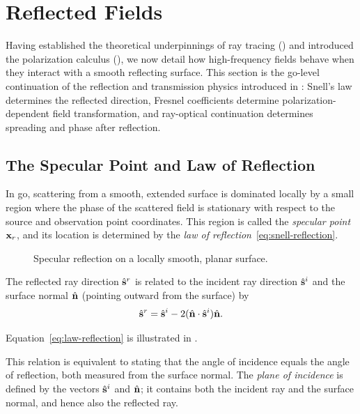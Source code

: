\section{\texorpdfstring{}{Geometrical Optics} Reflected Fields}

Having established the theoretical underpinnings of ray tracing () and introduced the polarization calculus (), we now detail how high-frequency fields behave when they interact with a smooth reflecting surface. This section is the \gls{go}-level continuation of the reflection and transmission physics introduced in : Snell's law determines the reflected direction, Fresnel coefficients determine polarization-dependent field transformation, and ray-optical continuation determines spreading and phase after reflection.

\subsection{The Specular Point and Law of Reflection}

In \gls{go}, scattering from a smooth, extended surface is dominated locally by a small region where the phase of the scattered field is stationary with respect to the source and observation point coordinates. This region is called the \emph{specular point} $\mathbf{x}_r$, and its location is determined by the \emph{law of reflection}~\eqref{eq:snell-reflection}.

\begin{figure}
  \centering
  \caption{Specular reflection on a locally smooth, planar surface.}
\end{figure}

The reflected ray direction $\hat{\mathbf{s}}^r$ is related to the incident ray direction $\hat{\mathbf{s}}^i$ and the surface normal $\hat{\mathbf{n}}$ (pointing outward from the surface) by
\begin{equation}
  \hat{\mathbf{s}}^r = \hat{\mathbf{s}}^i - 2 (\hat{\mathbf{n}} \cdot \hat{\mathbf{s}}^i) \hat{\mathbf{n}}.\label{eq:law-reflection}
\end{equation}

Equation~\eqref{eq:law-reflection} is illustrated in .

This relation is equivalent to stating that the angle of incidence equals the angle of reflection, both measured from the surface normal. The \emph{plane of incidence} is defined by the vectors $\hat{\mathbf{s}}^i$ and $\hat{\mathbf{n}}$; it contains both the incident ray and the surface normal, and hence also the reflected ray.


